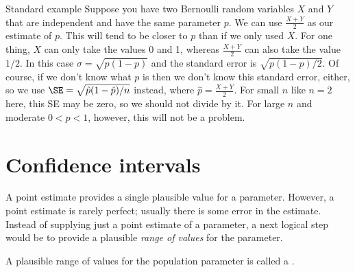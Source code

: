 \begin{example}{Standard example}%
Suppose you have two Bernoulli random variables $X$ and $Y$ that are independent and have the same parameter $p$.
We can use $\frac{X+Y}2$ as our estimate of $p$. This will tend to be closer to $p$ than if we only used $X$. For one thing, $X$ can only take the values 0 and 1,
whereas $\frac{X+Y}2$ can also take the value $1/2$. In this case $\sigma=\sqrt{p(1-p)}$ and the standard error is $\sqrt{p(1-p)/2}$.
Of course, if we don't know what $p$ is then we don't know this standard error, either, so we use $\SE=\sqrt{\hat p(1-\hat p)/n}$ instead, where $\hat p =\frac{X+Y}2$.
For small $n$ like $n=2$ here, this SE may be zero, so we should not divide by it. For large $n$ and moderate $0<p<1$, however, this will not be a problem.
\end{example}





\section{Confidence intervals}
\label{confidenceIntervals}


A point estimate provides a single plausible value for a parameter. However, a point estimate is rarely perfect; usually there is some error in the estimate. Instead of supplying just a point estimate of a parameter, a next logical step would be to provide a plausible \emph{range of values} for the parameter.



A plausible range of values for the population parameter is called a .




